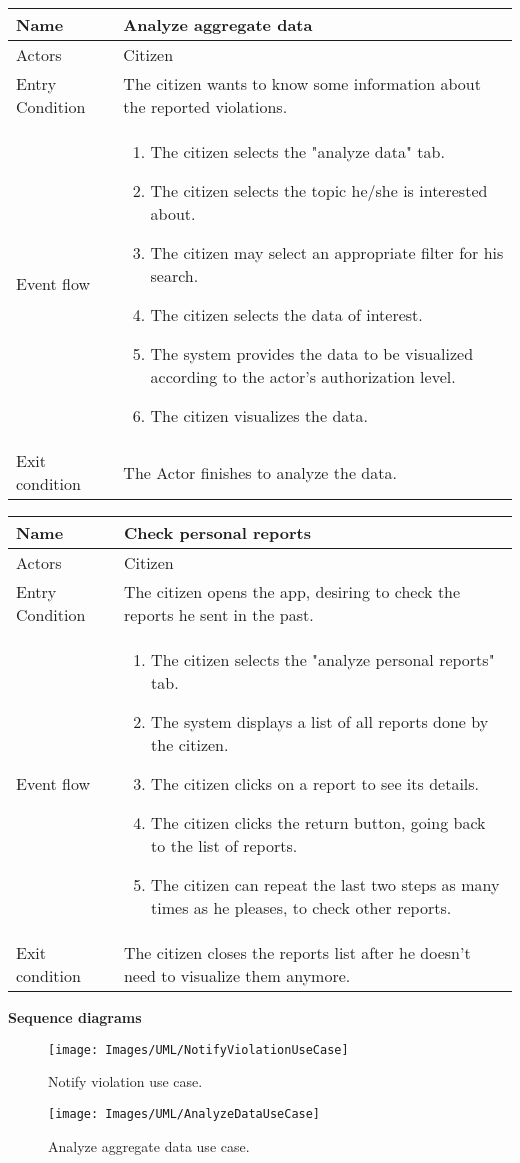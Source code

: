 \vskip 0.2in
\begin{tabular}{|p{3.1cm}|p{11.6cm}|}
\hline
Name & Analyze aggregate data\\
\hline
Actors & Citizen\\
\hline
Entry Condition & The citizen wants to know some information about the reported violations.\\
\hline
Event flow & \begin{enumerate}
                \item The citizen selects the "analyze data" tab.
                \item The citizen selects the topic he/she is interested about.
                \item The citizen may select an appropriate filter for his search.
                \item The citizen selects the data of interest.
                \item The system provides the data to be visualized according to the actor's authorization level.
                \item The citizen visualizes the data.
            \end{enumerate}\\
\hline
Exit condition & The Actor finishes to analyze the data.\\
\hline
\end{tabular}

\vskip 0.2in
\begin{tabular}{|p{3.1cm}|p{11.6cm}|}
	\hline
	Name & Check personal reports\\
	\hline
	Actors & Citizen\\
	\hline
	Entry Condition & The citizen opens the app, desiring to check the reports he sent in the past.\\
	\hline
	Event flow & \begin{enumerate}
		\item The citizen selects the "analyze personal reports" tab.
		\item The system displays a list of all reports done by the citizen.
		\item The citizen clicks on a report to see its details.
		\item The citizen clicks the return button, going back to the list of reports.
		\item The citizen can repeat the last two steps as many times as he pleases, to check other reports.
	\end{enumerate}\\
	\hline
	Exit condition & The citizen closes the reports list after he doesn't need to visualize them anymore.\\
	\hline
\end{tabular}

\newpage
\textbf{Sequence diagrams}
\begin{figure}[H]
	\centering
	\texttt{[image: Images/UML/NotifyViolationUseCase]}
	\caption{Notify violation use case.}
\end{figure}
\begin{figure}[H]
	\centering
	\texttt{[image: Images/UML/AnalyzeDataUseCase]}
	\caption{Analyze aggregate data use case.}
\end{figure}
